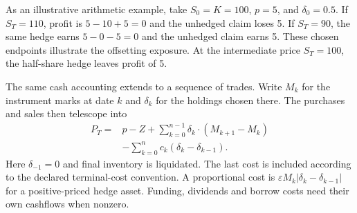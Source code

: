 \documentclass[8pt]{strategynet-journal}
\begin{document}
\begin{SNcolumns}
As an illustrative arithmetic example, take $S_0=K=100$, $p=5$, and
$\delta_0=0.5$. If $S_T=110$, profit is $5-10+5=0$ and the unhedged claim
loses 5. If $S_T=90$, the same hedge earns $5-0-5=0$ and the unhedged claim
earns 5. These chosen endpoints illustrate the offsetting exposure. At the
intermediate price $S_T=100$, the half-share hedge leaves profit of 5.

\begin{center}
\begin{minipage}{\linewidth}
\centering
{}
\captionsetup{font=normalsize}
\end{minipage}
\end{center}

The same cash accounting extends to a sequence of trades. Write $M_k$ for the
instrument marks at date $k$ and $\delta_k$ for the holdings chosen there. The
purchases and sales then telescope into
\[
\begin{split}
 P_T={}&p-Z+\sum_{k=0}^{n-1}\delta_k\cdot(M_{k+1}-M_k)\\
       &-\sum_{k=0}^{n}c_k(\delta_k-\delta_{k-1}).
\end{split}
\]
Here $\delta_{-1}=0$ and final inventory is liquidated. The last cost is included
according to the declared terminal-cost convention. A proportional cost is
$\varepsilon M_k|\delta_k-\delta_{k-1}|$ for a positive-priced hedge asset.
Funding, dividends and borrow costs need their own cashflows when nonzero.


\end{SNcolumns}
\end{document}
